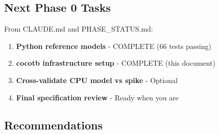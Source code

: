 \subsection{Next Phase 0 Tasks}\label{cr:app:archive-cocotb-setup-summary:next-phase-0-tasks}

\begin{record}

From CLAUDE.md and PHASE\_\allowbreak{}STATUS.md:

\begin{enumerate}
\def\labelenumi{\arabic{enumi}.}
\tightlist
\item
  \ok{} \textbf{Python reference models} - COMPLETE (66 tests passing)
\item
  \ok{} \textbf{cocotb infrastructure setup} - COMPLETE (this document)
\item
  \wip{} \textbf{Cross-validate CPU model vs spike} - Optional
\item
  \wip{} \textbf{Final specification review} - Ready when you are
\end{enumerate}

\end{record}

\subsection{Recommendations}\label{cr:app:archive-cocotb-setup-summary:recommendations}

